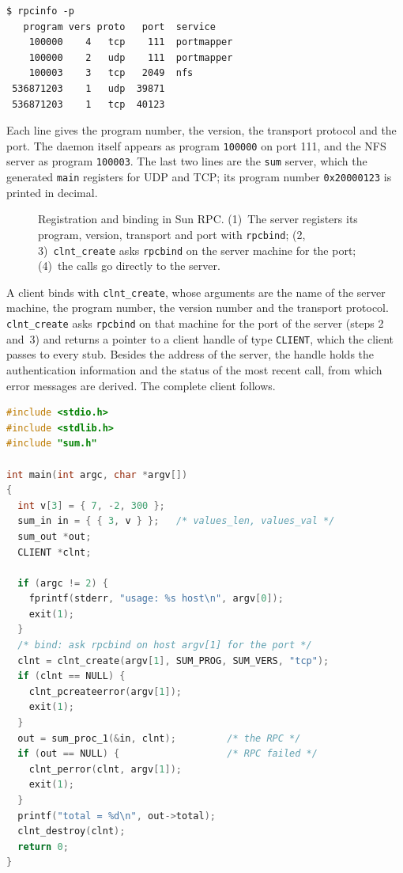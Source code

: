 \documentclass[../main.tex]{subfiles}
\begin{document}
\begin{lstlisting}[numbers=none]
$ rpcinfo -p
   program vers proto   port  service
    100000    4   tcp    111  portmapper
    100000    2   udp    111  portmapper
    100003    3   tcp   2049  nfs
 536871203    1   udp  39871
 536871203    1   tcp  40123
\end{lstlisting}

Each line gives the program number, the version, the transport protocol
and the port.  The daemon itself appears as program \texttt{100000} on
port 111, and the NFS server as program \texttt{100003}.  The last two lines are the
\texttt{sum} server, which the generated \texttt{main} registers for UDP
and TCP; its program number \texttt{0x20000123} is printed in decimal.

\begin{figure}[htbp]
  \centering
  
  \caption{Registration and binding in Sun RPC.  (1)~The server registers
    its program, version, transport and port with \texttt{rpcbind};
    (2,\,3)~\texttt{clnt\_create} asks \texttt{rpcbind} on the server
    machine for the port; (4)~the calls go directly to the server.}
  \label{fig:l13-rpcbind}
\end{figure}

A client binds with \texttt{clnt\_create}, whose arguments are the name of
the server machine, the program number, the version number and the
transport protocol.  \texttt{clnt\_create} asks \texttt{rpcbind} on that
machine for the port of the server (steps 2 and~3) and returns a pointer to
a client handle of type \texttt{CLIENT}, which the client passes to every
stub.  Besides the
address of the server, the handle holds the
authentication information and the status of the most recent call, from
which error messages are derived.  The complete client follows.

\begin{lstlisting}[language=C, numbers=none]
#include <stdio.h>
#include <stdlib.h>
#include "sum.h"

int main(int argc, char *argv[])
{
  int v[3] = { 7, -2, 300 };
  sum_in in = { { 3, v } };   /* values_len, values_val */
  sum_out *out;
  CLIENT *clnt;

  if (argc != 2) {
    fprintf(stderr, "usage: %s host\n", argv[0]);
    exit(1);
  }
  /* bind: ask rpcbind on host argv[1] for the port */
  clnt = clnt_create(argv[1], SUM_PROG, SUM_VERS, "tcp");
  if (clnt == NULL) {
    clnt_pcreateerror(argv[1]);
    exit(1);
  }
  out = sum_proc_1(&in, clnt);         /* the RPC */
  if (out == NULL) {                   /* RPC failed */
    clnt_perror(clnt, argv[1]);
    exit(1);
  }
  printf("total = %d\n", out->total);
  clnt_destroy(clnt);
  return 0;
}
\end{lstlisting}
\end{document}
